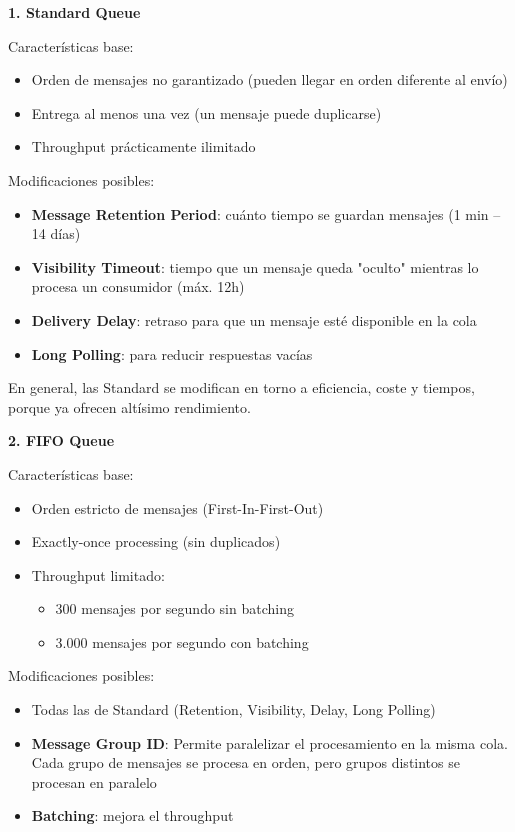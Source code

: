 \documentclass[12pt,a4paper]{report}
\begin{document}
\textbf{1. Standard Queue}

Características base:
\begin{itemize}
    \item Orden de mensajes no garantizado (pueden llegar en orden diferente al envío)
    \item Entrega al menos una vez (un mensaje puede duplicarse)
    \item Throughput prácticamente ilimitado
\end{itemize}

Modificaciones posibles:
\begin{itemize}
    \item \textbf{Message Retention Period}: cuánto tiempo se guardan mensajes (1 min – 14 días)
    \item \textbf{Visibility Timeout}: tiempo que un mensaje queda "oculto" mientras lo procesa un consumidor (máx. 12h)
    \item \textbf{Delivery Delay}: retraso para que un mensaje esté disponible en la cola
    \item \textbf{Long Polling}: para reducir respuestas vacías
\end{itemize}

\begin{conceptbox}
En general, las Standard se modifican en torno a eficiencia, coste y tiempos, porque ya ofrecen altísimo rendimiento.
\end{conceptbox}

\textbf{2. FIFO Queue}

Características base:
\begin{itemize}
    \item Orden estricto de mensajes (First-In-First-Out)
    \item Exactly-once processing (sin duplicados)
    \item Throughput limitado:
    \begin{itemize}
        \item 300 mensajes por segundo sin batching
        \item 3.000 mensajes por segundo con batching
    \end{itemize}
\end{itemize}

Modificaciones posibles:
\begin{itemize}
    \item Todas las de Standard (Retention, Visibility, Delay, Long Polling)
    \item \textbf{Message Group ID}: Permite paralelizar el procesamiento en la misma cola. Cada grupo de mensajes se procesa en orden, pero grupos distintos se procesan en paralelo
    \item \textbf{Batching}: mejora el throughput
\end{itemize}
\end{document}
